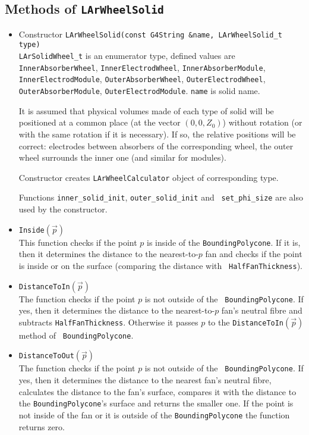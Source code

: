 \documentclass{article}
\begin{document}
\subsection{Methods of {\tt LArWheelSolid}}
\begin{itemize}
\item Constructor {\tt LArWheelSolid(const G4String \&name, LArWheelSolid\_t
type)}\\
{\tt LArSolidWheel\_t} is an enumerator type, defined values are
{\tt InnerAbsorberWheel},
{\tt InnerElectrodWheel}, {\tt InnerAbsorberModule}, {\tt InnerElectrodModule},
{\tt OuterAbsorberWheel}, {\tt OuterElectrodWheel}, {\tt OuterAbsorberModule},
{\tt OuterElectrodModule}. {\tt name} is solid name.

It is assumed that physical volumes made of each type of solid will be
positioned at a common place (at the vector $(0, 0, Z_0)$) without rotation (or
with the same rotation if it is necessary). If so, the relative
positions  will be correct: electrodes between absorbers of the corresponding
wheel, the outer wheel surrounds the inner one (and similar for modules).

Constructor creates {\tt LArWheelCalculator} object of corresponding type.

Functions {\tt inner\_solid\_init}, {\tt outer\_solid\_init} and {\tt
set\_phi\_size} are also used by the constructor.

\item {\tt Inside$(\vec{p})$}\\
This function checks if the point $p$ is inside of the {\tt BoundingPolycone}.
If it is, then it determines the distance to the nearest-to-$p$ fan and 
checks if the
point is inside or on the surface (comparing the distance with {\tt
HalfFanThickness}).

\item {\tt DistanceToIn$(\vec{p})$}\\
The function checks if the point $p$ is not outside of the {\tt
BoundingPolycone}. If yes, then it determines the distance to the nearest-to-$p$
fan's neutral fibre and subtracts {\tt HalfFanThickness}. Otherwise it 
passes $p$ to the {\tt DistanceToIn$(\vec{p})$} method of {\tt
BoundingPolycone}.

\item {\tt DistanceToOut$(\vec{p})$}\\
The function checks if the point $p$ is not outside of the {\tt
BoundingPolycone}. If 
yes, then it determines the distance to the nearest fan's neutral fibre,
calculates the distance to the fan's surface, compares it with the distance to
the {\tt BoundingPolycone}'s surface and returns the smaller one. If the point
is not inside of the fan or it is outside of the {\tt BoundingPolycone} the
function returns zero.


\end{itemize}
\end{document}
